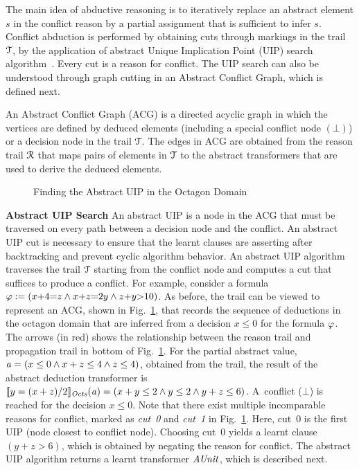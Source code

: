 The main idea of abductive  reasoning is to iteratively replace an abstract
element $s$ in the conflict reason by a partial assignment that is sufficient 
to infer $s$.  Conflict abduction is performed by obtaining cuts through markings 
in the trail $\mathcal{T}$, by the application of abstract Unique Implication Point (UIP) 
search algorithm~\cite{cdcl}.  Every cut is a reason for conflict.  The UIP
search can also be understood through graph cutting in an Abstract Conflict
Graph, which is defined next. 
\begin{definition}
  An Abstract Conflict Graph (ACG) is a directed acyclic graph in
  which the vertices are defined by deduced elements (including a
  special conflict node $(\bot)$) or a decision node in the trail
  $\mathcal{T}$.  The edges in ACG are obtained from the reason trail
  $\mathcal{R}$ that maps pairs of elements in $\mathcal{T}$ to the abstract
  transformers that are used to derive the deduced elements.  
\end{definition}
%
\begin{figure}[t]
\centering
{}
\caption{\label{uip}Finding the Abstract UIP in the Octagon Domain}
\end{figure}  
%
\noindent \textbf{Abstract UIP Search}
An abstract UIP is a node in the ACG that must be traversed on every path between a 
decision node and the conflict. An abstract UIP cut is necessary to ensure that
the learnt clauses are asserting after backtracking and prevent cyclic algorithm
behavior. 
An abstract UIP algorithm~\cite{DBLP:journals/fmsd/BrainDGHK14} traverses
the trail $\mathcal{T}$ starting from the conflict node and computes a cut that
suffices to produce a conflict.  For example, consider a formula $\varphi:=
(x{+}4{=}z \wedge x{+}z{=}2y \wedge z{+}y{>}10)$.  As before, the trail can be
viewed to represent an ACG, shown in Fig.~\ref{uip}, that records the 
sequence of deductions in the octagon domain that are inferred
from a decision $x {\leq} 0$ for the formula $\varphi$.  The arrows (in
red) shows the relationship between the reason trail and propagation trail
in bottom of Fig.~\ref{uip}.  For the partial abstract value,
$\mathit{a}=(x\leq0 \wedge x+z\leq4 \wedge z\leq4)$, obtained from the trail,
the result of the abstract deduction transformer is
$\llbracket y=(x+z)/2 \rrbracket_{\mathit{Octs}}(\mathit{a})=(x+y\leq2 \wedge y\leq2 \wedge y+z\leq6)$. 
A~conflict ($\bot$) is reached for the decision ${x{\leq}0}$.  Note that
there exist multiple incomparable reasons for conflict, marked as {\em cut~0}
and {\em cut~1} in Fig.~\ref{uip}.  Here, cut~0 is the first UIP (node closest
to conflict node).  Choosing cut~0 yields a learnt clause $(y+z>6)$, which is
obtained by negating the reason for conflict.  The abstract UIP algorithm
returns a learnt transformer $\mathit{AUnit}$, which is described next.\\
%

